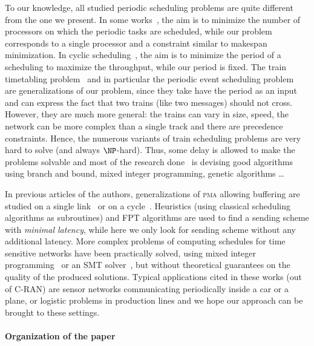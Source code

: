 \documentclass[a4paper,UKenglish,cleveref, autoref, thm-restate]{lipics-v2019}
\newcommand\pma{\textsc{pma}\xspace}
\begin{document}
 To our knowledge, all studied periodic scheduling problems are quite different from the one we present.
In some works~\cite{korst1991periodic,hanen1993cyclic}, the aim is to minimize the number of processors on which the periodic tasks are scheduled, while our problem corresponds to a single processor and a constraint similar to makespan minimization. In cyclic scheduling~\cite{levner2010complexity}, the aim is to minimize the period of a scheduling to maximize the throughput, while our period is fixed. The train timetabling problem~\cite{lusby2011railway} and in particular the periodic event scheduling problem~\cite{serafini1989mathematical} are generalizations of our problem, since they take have the period as an input and can express the fact that two trains (like two messages) should not cross. However, they are much more general: the trains can vary in size, speed, the network can be more complex than a single track and there are precedence constraints. Hence, the numerous variants of train scheduling problems are very hard to solve (and always $\NP$-hard). Thus, some delay is allowed to make the problems solvable and most of the research done~\cite{lusby2011railway} is devising good algorithms using branch and bound, mixed integer programming, genetic algorithms \dots

In previous articles of the authors, generalizations of \pma allowing buffering are studied on a single link~\cite{dominique2018deterministic} or on a cycle~\cite{Guir1905:Deterministic}. Heuristics (using classical scheduling algorithms as subroutines) and FPT algorithms are used to find a sending scheme with \emph{minimal latency}, while here we only look for sending scheme without any additional latency. More complex problems of computing schedules for time sensitive networks have been practically solved, using mixed integer programming~\cite{nayak2017incremental,steiner2018traffic} or an SMT solver~\cite{dos2019tsnsched}, but without theoretical guarantees on the quality of the produced solutions. Typical applications cited in these works (out of C-RAN) are sensor networks communicating periodically inside a car or a plane, or logistic problems in production lines and we hope our approach can be brought to these settings.



\paragraph*{Organization of the paper}
\end{document}
